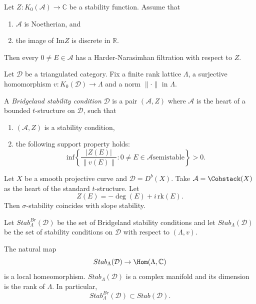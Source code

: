 \documentclass{book}
\begin{document}
\begin{lemma}
\label{lemma-harder-narasimhan-existence}
Let $Z:K_0(\mathcal{A})\to \mathbb{C}$
be a stability function.
Assume that
\begin{enumerate}
\item $\mathcal{A}$ is Noetherian, and
\item the image of $\text{Im}Z$
is discrete in $\mathbb{R}$.
\end{enumerate}
Then every $0 \neq E \in \mathcal{A}$
has a Harder-Narasimhan filtration
with respect to $Z$.
\end{lemma}

\noindent
Let $\mathcal{D}$ be a triangulated
category. Fix a finite rank lattice
$\Lambda$, a surjective homomorphism
$v:K_0(\mathcal{D}) \to \Lambda$
and a norm $\|\cdot\|$ in $\Lambda$.

\begin{definition}
\label{definition-bridgeland-stability}
A {\it Bridgeland stability condition}
$\mathcal{D}$ is a pair $(\mathcal{A},Z)$
where $\mathcal{A}$ is the heart of a
bounded $t$-structure on $\mathcal{D}$,
such that
\begin{enumerate}
\item $(\mathcal{A},Z)$ is a stability
condition,
\item the following support property
holds:
$$
\text{inf}\left\{
\frac{|Z(E)|}{
\|v(E)\|}
:0 \neq  E \in \mathcal{A}
\text{semistable}\right\}
>0.
$$
\end{enumerate}
\end{definition}

\begin{example}
\label{example-stability-curve}
Let $X$ be a smooth projective
curve and $\mathcal{D}=D^b(X)$.
Take $\mathcal{A}=\Cohstack(X)$ as the
heart of the standard
$t$-structure.
Let
$$
Z(E)=-\deg(E)+i\,\mathrm{rk}(E).
$$
Then $\sigma$-stability coincides
with slope stability.
\end{example}

\noindent
Let $Stab^{Br}_\Lambda(\mathcal{D})$
be the set of Bridgeland stability
conditions and let
$Stab_\Lambda(\mathcal{D})$ be the set
of stability conditions on $\mathcal{D}$
with respect to $(\Lambda,v)$.

\begin{theorem}[Bridgeland]
\label{theorem-bridgeland}
The natural map
$$
Stab_\Lambda(\mathcal{D})
\to \Hom(\Lambda,\mathbb{C})
$$
is a local homeomorphism.
$Stab_\Lambda(\mathcal{D})$ is a complex
manifold and
its dimension is the rank of $\Lambda$.
In particular,
$$
Stab_\Lambda^{Br}(\mathcal{D})
\subset
Stab(\mathcal{D}).
$$
\end{theorem}
\end{document}
